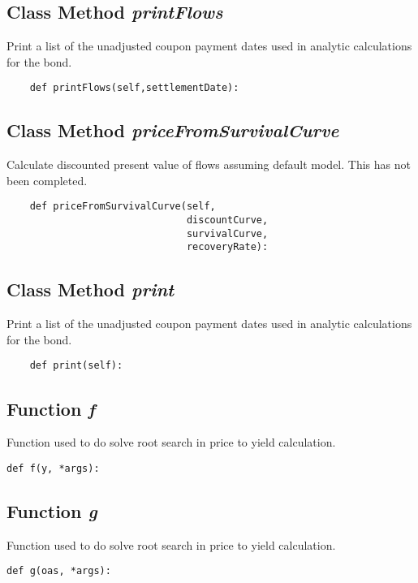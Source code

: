\documentclass[twoside,11pt]{book}
\begin{document}
\subsection{Class Method {\it printFlows}}
Print a list of the unadjusted coupon payment dates used in analytic calculations for the bond. 

\begin{lstlisting}
    def printFlows(self,settlementDate):
\end{lstlisting}

\subsection{Class Method {\it priceFromSurvivalCurve}}
Calculate discounted present value of flows assuming default model. This has not been completed. 

\begin{lstlisting}
    def priceFromSurvivalCurve(self, 
                               discountCurve, 
                               survivalCurve, 
                               recoveryRate):
\end{lstlisting}

\subsection{Class Method {\it print}}
Print a list of the unadjusted coupon payment dates used in analytic calculations for the bond. 

\begin{lstlisting}
    def print(self):
\end{lstlisting}

\subsection{Function {\it f}}
Function used to do solve root search in price to yield calculation. 

\begin{lstlisting}
def f(y, *args):
\end{lstlisting}

\subsection{Function {\it g}}
Function used to do solve root search in price to yield calculation. 

\begin{lstlisting}
def g(oas, *args):
\end{lstlisting}
\end{document}
